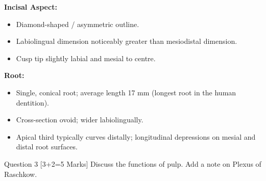 \documentclass[11pt,a4paper]{article}
\begin{document}
\begin{ansbox}
\textbf{Incisal Aspect:}
\begin{itemize}[leftmargin=*]
    \item Diamond-shaped / asymmetric outline.
    \item Labiolingual dimension noticeably greater than mesiodistal dimension.
    \item Cusp tip slightly labial and mesial to centre.
\end{itemize}

\textbf{Root:}
\begin{itemize}[leftmargin=*]
    \item Single, conical root; average length 17 mm (longest root in the human dentition).
    \item Cross-section ovoid; wider labiolingually.
    \item Apical third typically curves distally; longitudinal depressions on mesial and distal root surfaces.
\end{itemize}
\end{ansbox}

\begin{qbox}{Question 3 [3+2=5 Marks]}
Discuss the functions of pulp. Add a note on Plexus of Raschkow.
\end{qbox}
\end{document}
